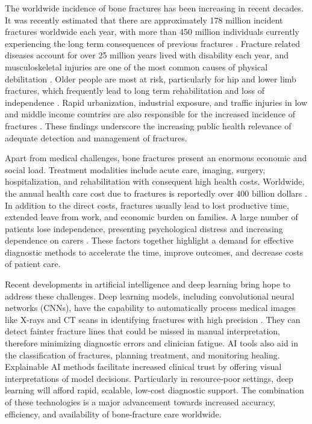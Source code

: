 \documentclass{styles/svproc}
\begin{document}
The worldwide incidence of bone fractures has been increasing in recent decades. It was recently estimated that there are approximately 178 million incident fractures worldwide each year, with more than 450 million individuals currently experiencing the long term consequences of previous fractures \cite{Zhang2024}. Fracture related diseases account for over 25 million years lived with disability each year, and musculoskeletal injuries are one of the most common causes of physical debilitation \cite{Pugazhendhi2022}. Older people are most at risk, particularly for hip and lower limb fractures, which frequently lead to long term rehabilitation and loss of independence \cite{Hulsbaek2022}. Rapid urbanization, industrial exposure, and traffic injuries in low and middle income countries are also responsible for the increased incidence of fractures \cite{Zhao2025}. These findings underscore the increasing public health relevance of adequate detection and management of fractures.

Apart from medical challenges, bone fractures present an enormous economic and social load. Treatment modalities include acute care, imaging, surgery, hospitalization, and rehabilitation with consequent high health costs. Worldwide, the annual health care cost due to fractures is reportedly over 400 billion dollars \cite{Singer2023}. In addition to the direct costs, fractures usually lead to lost productive time, extended leave from work, and economic burden on families. A large number of patients lose independence, presenting psychological distress and increasing dependence on carers \cite{Cormican2022}. These factors together highlight a demand for effective diagnostic methods to accelerate the time, improve outcomes, and decrease costs of patient care.

Recent developments in artificial intelligence and deep learning bring hope to address these challenges. Deep learning models, including convolutional neural networks (CNNs), have the capability to automatically process medical images like X-rays and CT scans in identifying fractures with high precision \cite{Kumar2024}. They can detect fainter fracture lines that could be missed in manual interpretation, therefore minimizing diagnostic errors and clinician fatigue. AI tools also aid in the classification of fractures, planning treatment, and monitoring healing. Explainable AI methods facilitate increased clinical trust by offering visual interpretations of model decisions. Particularly in resource-poor settings, deep learning will afford rapid, scalable, low-cost diagnostic support. The combination of these technologies is a major advancement towards increased accuracy, efficiency, and availability of bone-fracture care worldwide.
\end{document}

